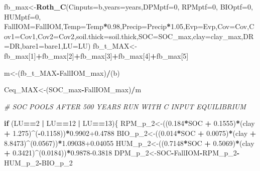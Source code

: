 \documentclass[
  10pt,
  b5paper,
]{book}
\newenvironment{Shaded}{\begin{snugshade}}{\end{snugshade}}
\newcommand{\CommentTok}[1]{\textcolor[rgb]{0.56,0.35,0.01}{\textit{#1}}}
\newcommand{\ControlFlowTok}[1]{\textcolor[rgb]{0.13,0.29,0.53}{\textbf{#1}}}
\newcommand{\DataTypeTok}[1]{\textcolor[rgb]{0.13,0.29,0.53}{#1}}
\newcommand{\DecValTok}[1]{\textcolor[rgb]{0.00,0.00,0.81}{#1}}
\newcommand{\FloatTok}[1]{\textcolor[rgb]{0.00,0.00,0.81}{#1}}
\newcommand{\KeywordTok}[1]{\textcolor[rgb]{0.13,0.29,0.53}{\textbf{#1}}}
\newcommand{\NormalTok}[1]{#1}
\newcommand{\OperatorTok}[1]{\textcolor[rgb]{0.81,0.36,0.00}{\textbf{#1}}}
\newcommand{\StringTok}[1]{\textcolor[rgb]{0.31,0.60,0.02}{#1}}
\begin{document}
\begin{Shaded}
\begin{Highlighting}[]
{\NormalTok{fb_max<-}\KeywordTok{Roth_C}\NormalTok{(}\DataTypeTok{Cinputs=}\NormalTok{b,}\DataTypeTok{years=}\NormalTok{years,}\DataTypeTok{DPMptf=}\DecValTok{0}\NormalTok{, }\DataTypeTok{RPMptf=}\DecValTok{0}\NormalTok{, }\DataTypeTok{BIOptf=}\DecValTok{0}\NormalTok{, }\DataTypeTok{HUMptf=}\DecValTok{0}\NormalTok{, }\DataTypeTok{FallIOM=}\NormalTok{FallIOM,}\DataTypeTok{Temp=}\NormalTok{Temp}\OperatorTok{*}\FloatTok{0.98}\NormalTok{,}\DataTypeTok{Precip=}\NormalTok{Precip}\OperatorTok{*}\FloatTok{1.05}\NormalTok{,}\DataTypeTok{Evp=}\NormalTok{Evp,}\DataTypeTok{Cov=}\NormalTok{Cov,}\DataTypeTok{Cov1=}\NormalTok{Cov1,}\DataTypeTok{Cov2=}\NormalTok{Cov2,}\DataTypeTok{soil.thick=}\NormalTok{soil.thick,}\DataTypeTok{SOC=}\NormalTok{SOC_max,}\DataTypeTok{clay=}\NormalTok{clay_max,}\DataTypeTok{DR=}\NormalTok{DR,}\DataTypeTok{bare1=}\NormalTok{bare1,}\DataTypeTok{LU=}\NormalTok{LU)}
\NormalTok{fb_t_MAX<-fb_max[}\DecValTok{1}\NormalTok{]}\OperatorTok{+}\NormalTok{fb_max[}\DecValTok{2}\NormalTok{]}\OperatorTok{+}\NormalTok{fb_max[}\DecValTok{3}\NormalTok{]}\OperatorTok{+}\NormalTok{fb_max[}\DecValTok{4}\NormalTok{]}\OperatorTok{+}\NormalTok{fb_max[}\DecValTok{5}\NormalTok{]}

\NormalTok{m<-(fb_t_MAX}\OperatorTok{-}\NormalTok{FallIOM_max)}\OperatorTok{/}\NormalTok{(b)}

\NormalTok{Ceq_MAX<-(SOC_max}\OperatorTok{-}\NormalTok{FallIOM_max)}\OperatorTok{/}\NormalTok{m}
 
\CommentTok{# SOC POOLS AFTER 500 YEARS RUN WITH C INPUT EQUILIBRIUM}

\ControlFlowTok{if}\NormalTok{ (LU}\OperatorTok{==}\DecValTok{2} \OperatorTok{|}\StringTok{ }\NormalTok{LU}\OperatorTok{==}\DecValTok{12} \OperatorTok{|}\StringTok{ }\NormalTok{LU}\OperatorTok{==}\DecValTok{13}\NormalTok{)\{}
\NormalTok{RPM_p_}\DecValTok{2}\NormalTok{<-((}\FloatTok{0.184}\OperatorTok{*}\NormalTok{SOC }\OperatorTok{+}\StringTok{ }\FloatTok{0.1555}\NormalTok{)}\OperatorTok{*}\NormalTok{(clay }\OperatorTok{+}\StringTok{ }\FloatTok{1.275}\NormalTok{)}\OperatorTok{^}\NormalTok{(}\OperatorTok{-}\FloatTok{0.1158}\NormalTok{))}\OperatorTok{*}\FloatTok{0.9902+0.4788}
\NormalTok{BIO_p_}\DecValTok{2}\NormalTok{<-((}\FloatTok{0.014}\OperatorTok{*}\NormalTok{SOC }\OperatorTok{+}\StringTok{ }\FloatTok{0.0075}\NormalTok{)}\OperatorTok{*}\NormalTok{(clay }\OperatorTok{+}\StringTok{ }\FloatTok{8.8473}\NormalTok{)}\OperatorTok{^}\NormalTok{(}\FloatTok{0.0567}\NormalTok{))}\OperatorTok{*}\FloatTok{1.09038+0.04055}
\NormalTok{HUM_p_}\DecValTok{2}\NormalTok{<-((}\FloatTok{0.7148}\OperatorTok{*}\NormalTok{SOC }\OperatorTok{+}\StringTok{ }\FloatTok{0.5069}\NormalTok{)}\OperatorTok{*}\NormalTok{(clay }\OperatorTok{+}\StringTok{ }\FloatTok{0.3421}\NormalTok{)}\OperatorTok{^}\NormalTok{(}\FloatTok{0.0184}\NormalTok{))}\OperatorTok{*}\FloatTok{0.9878-0.3818}
\NormalTok{DPM_p_}\DecValTok{2}\NormalTok{<-SOC}\OperatorTok{-}\NormalTok{FallIOM}\OperatorTok{-}\NormalTok{RPM_p_}\DecValTok{2}\OperatorTok{-}\NormalTok{HUM_p_}\DecValTok{2}\OperatorTok{-}\NormalTok{BIO_p_}\DecValTok{2}

}
\end{Highlighting}
\end{Shaded}
\end{document}
